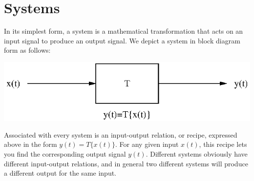 \documentclass[10pt]{beamer}
\begin{document}
\pagestyle{fancy}
\fancyhead{}
\renewcommand{\headrulewidth}{0pt}
\fancyfoot[C]{\thesection-\thepage}

\begin{frame}
  \titlepage
\end{frame}

\setcounter{section}{2}
\section{Systems}



In its simplest form, a system is a mathematical transformation that acts on an input signal to produce an output signal.  We depict a system in block diagram form as follows:
\begin{center}
  \includegraphics{simplesystem}
\end{center}
Associated with every system is an input-output relation, or recipe, expressed above in the form $y(t) = T\{x(t)\}$.  For any given input $x(t)$, this recipe lets you find the corresponding output signal $y(t)$.  Different systems obviously have different input-output relations, and in general two different systems will produce a different output for the same input.
\end{document}
